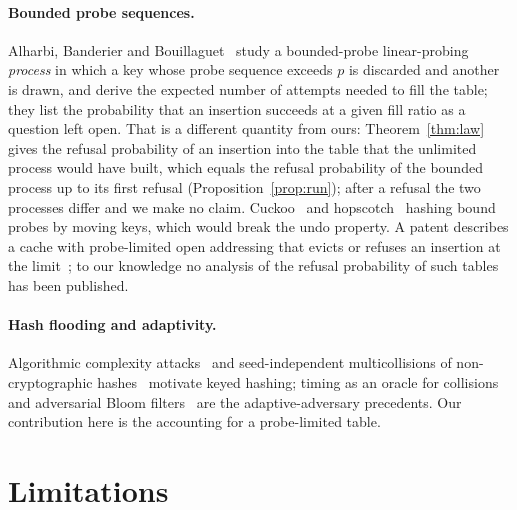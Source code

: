 \documentclass[11pt,a4paper]{article}
\theoremstyle{definition}
\theoremstyle{remark}
\begin{document}
\paragraph{Bounded probe sequences.} Alharbi, Banderier and Bouillaguet~\cite{abb2026} study a bounded-probe linear-probing \emph{process} in which a key whose probe sequence exceeds $p$ is discarded and another is drawn, and derive the expected number of attempts needed to fill the table; they list the probability that an insertion succeeds at a given fill ratio as a question left open. That is a different quantity from ours: Theorem~\ref{thm:law} gives the refusal probability of an insertion into the table that the unlimited process would have built, which equals the refusal probability of the bounded process up to its first refusal (Proposition~\ref{prop:run}); after a refusal the two processes differ and we make no claim. Cuckoo~\cite{pagh2004} and hopscotch~\cite{herlihy2008} hashing bound probes by moving keys, which would break the undo property. A patent describes a cache with probe-limited open addressing that evicts or refuses an insertion at the limit~\cite{nemes2015}; to our knowledge no analysis of the refusal probability of such tables has been published.

\paragraph{Hash flooding and adaptivity.} Algorithmic complexity attacks~\cite{crosby2003} and seed-independent multicollisions of non-cryptographic hashes~\cite{aumasson2012} motivate keyed hashing; timing as an oracle for collisions~\cite{lipton1993} and adversarial Bloom filters~\cite{naor2015} are the adaptive-adversary precedents. Our contribution here is the accounting for a probe-limited table.

\section{Limitations}\label{sec:limits}
\end{document}
